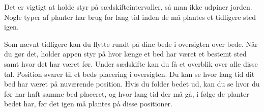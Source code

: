 \begin{minipage}{0.55\textwidth}
Det er vigtigt at holde styr på sædskifteintervaller, så man ikke udpiner jorden. Nogle typer af planter har brug for lang tid inden de må plantes et tidligere sted igen.

Som nævnt tidligere kan du flytte rundt på dine bede i oversigten over bede. Når du gør det, holder appen styr på hvor længe et bed har været et bestemt sted samt hvor det har været før. Under sædskifte kan du få et overblik over alle disse tal. Position svarer til et beds placering i oversigten. Du kan se hvor lang tid dit bed har været på nuværende position. Hvis du folder bedet ud, kan du se hvor du før har haft samme bed placeret, og hvor lang tid der må gå, i følge de planter bedet har, før det igen må plantes på disse positioner.
\end{minipage} 


